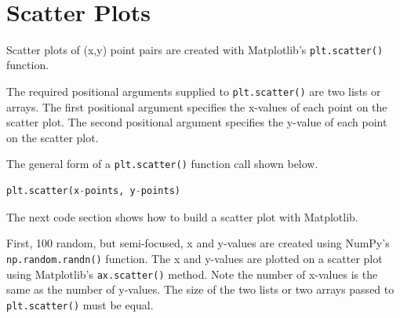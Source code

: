 \documentclass{book}
\begin{document}
    \begin{center}
    \end{center}
    { \hspace*{\fill} \\}
    

    
        \section{Scatter Plots}\label{scatter-plots}
    




    
        Scatter plots of (x,y) point pairs are created with Matplotlib's
\lstinline!plt.scatter()! function.

The required positional arguments supplied to \lstinline!plt.scatter()!
are two lists or arrays. The first positional argument specifies the
x-values of each point on the scatter plot. The second positional
argument specifies the y-value of each point on the scatter plot.

The general form of a \lstinline!plt.scatter()! function call shown
below.

\begin{lstlisting}[language=Python]
plt.scatter(x-points, y-points)
\end{lstlisting}

The next code section shows how to build a scatter plot with Matplotlib.

First, 100 random, but semi-focused, x and y-values are created using
NumPy's \lstinline!np.random.randn()! function. The x and y-values are
plotted on a scatter plot using Matplotlib's \lstinline!ax.scatter()!
method. Note the number of x-values is the same as the number of
y-values. The size of the two lists or two arrays passed to
\lstinline!plt.scatter()! must be equal.
    
\end{document}
